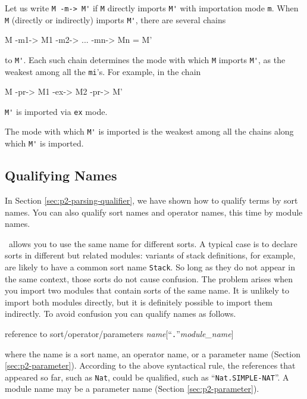 \documentclass[a4paper]{memoir}
\begin{document}
Let us write \verb|M -m-> M'| if \verb|M| directly imports
\verb|M'| with importation mode \verb|m|. When \verb|M| (directly or
indirectly) imports \verb|M'|, there are several chains
\begin{vvtm}
\begin{ccode}
  M -m1-> M1 -m2-> ... -mn-> Mn = M'
\end{ccode}
\end{vvtm}
to \verb|M'|. Each such chain determines the mode with which
\verb|M| imports \verb|M'|, as the weakest among all the
\verb|mi|'s. For example, in the chain
\begin{vvtm}
\begin{ccode}
  M -pr-> M1 -ex-> M2 -pr-> M'
\end{ccode}
\end{vvtm}
\verb|M'| is imported via \verb|ex| mode.

The mode with which \verb|M'| is imported is the weakest among
all the chains along which \verb|M'| is imported.

\subsection{Qualifying Names}\label{sec:p2-naming-and-qualification}

In Section \ref{sec:p2-parsing-qualifier}, we have shown how to qualify
terms by sort names. You can also qualify sort names and operator names,
this time by module names.

\cafeobj~allows you to use the same name for different sorts.
A typical case is to declare sorts in different but related
modules: variants of stack definitions, for example, are likely to
have a common sort name \verb|Stack|.
So long as they do not appear in the same context, those
sorts do not cause confusion. The problem arises when you import
two modules that contain sorts of the same name.
It is unlikely to import both modules directly, but it is
definitely possible to import them indirectly. To avoid confusion
you can qualify names as follows.

\begin{bsyntax} reference to sort/operator/parameters \Hline
\textit{name}$[$``\texttt{.}''\textit{module\_name}$]$
\end{bsyntax}

where the name is a sort name, an operator name, or a parameter name
(Section \ref{sec:p2-parameter}). According to the above
syntactical rule, the references that
appeared so far, such as \verb|Nat|, could be qualified, such
as ``\verb|Nat.SIMPLE-NAT|''.
A module name may be a parameter name (Section \ref{sec:p2-parameter}).
\end{document}
